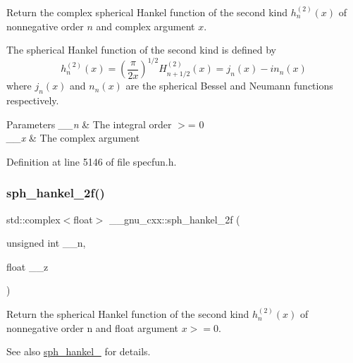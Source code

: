 Return the complex spherical Hankel function of the second kind $ h^{(2)}_n(x) $ of nonnegative order $ n $ and complex argument $ x $.

The spherical Hankel function of the second kind is defined by \[ h^{(2)}_n(x) = \left(\frac{\pi}{2x} \right) ^{1/2} H^{(2)}_{n+1/2}(x) = j_n(x) - i n_n(x) \] where $ j_n(x) $ and $ n_n(x) $ are the spherical Bessel and Neumann functions respectively.


\begin{DoxyParams}{Parameters}
{\em \+\_\+\+\_\+n} & The integral order $>$= 0 \\
\hline
{\em \+\_\+\+\_\+x} & The complex argument \\
\hline
\end{DoxyParams}


Definition at line 5146 of file specfun.\+h.

\mbox{\label{group__gnu__math__spec__func_ga9496b81f94b8ba0162cf45df72be1e71}} 
\subsubsection{\texorpdfstring{sph\+\_\+hankel\+\_\+2f()}{sph\_hankel\_2f()}\hspace{0.1cm}{\footnotesize\ttfamily [1/2]}}
{\footnotesize\ttfamily std\+::complex$<$float$>$ \+\_\+\+\_\+gnu\+\_\+cxx\+::sph\+\_\+hankel\+\_\+2f (\begin{DoxyParamCaption}\item[{unsigned int}]{\+\_\+\+\_\+n,  }\item[{float}]{\+\_\+\+\_\+z }\end{DoxyParamCaption})\hspace{0.3cm}{\ttfamily [inline]}}

Return the spherical Hankel function of the second kind $ h^{(2)}_n(x)$ of nonnegative order n and {\ttfamily float} argument $ x >= 0 $.

\begin{DoxySeeAlso}{See also}
\hyperlink{group__gnu__math__spec__func_ga1ca08866a25e3637b04c57ff5a0c36a5}{sph\+\_\+hankel\+\_} for details. 
\end{DoxySeeAlso}


